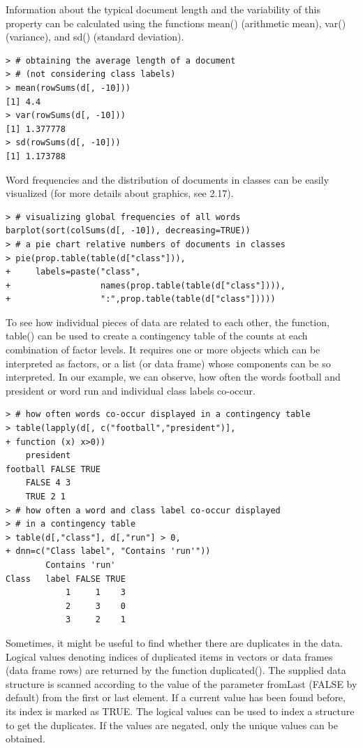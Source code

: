 \documentclass[11pt,openany,executivepaper]{book}
\begin{document}
Information about the typical document length and the variability of this property can be calculated using the functions mean() (arithmetic mean), var() (variance), and sd() (standard deviation).

\begin{verbatim}
> # obtaining the average length of a document
> # (not considering class labels)
> mean(rowSums(d[, -10]))
[1] 4.4
> var(rowSums(d[, -10]))
[1] 1.377778
> sd(rowSums(d[, -10]))
[1] 1.173788
\end{verbatim}

Word frequencies and the distribution of documents in classes can be easily visualized (for more details about graphics, see 2.17).

\begin{verbatim}
> # visualizing global frequencies of all words
barplot(sort(colSums(d[, -10]), decreasing=TRUE))
> # a pie chart relative numbers of documents in classes
> pie(prop.table(table(d["class"])),
+     labels=paste("class",
+                  names(prop.table(table(d["class"]))),
+                  ":",prop.table(table(d["class"]))))
\end{verbatim}

To see how individual pieces of data are related to each other, the function, table() can be used to create a contingency table of the counts at each combination of factor levels. It requires one or more objects which can be interpreted as factors, or a list (or data frame) whose components can be so interpreted. In our example, we can observe, how often the words football and president or word run and individual class labels co-occur.

\begin{verbatim}
> # how often words co-occur displayed in a contingency table
> table(lapply(d[, c("football","president")],
+ function (x) x>0))
    president
football FALSE TRUE
    FALSE 4 3
    TRUE 2 1
> # how often a word and class label co-occur displayed
> # in a contingency table
> table(d[,"class"], d[,"run"] > 0,
+ dnn=c("Class label", "Contains 'run'"))
        Contains 'run'
Class   label FALSE TRUE
            1     1    3
            2     3    0
            3     2    1
\end{verbatim}

Sometimes, it might be useful to find whether there are duplicates in the data. Logical values denoting indices of duplicated items in vectors or data frames (data frame rows) are returned by the function duplicated(). The supplied data structure is scanned according to the value of the parameter fromLast (FALSE by default) from the first or last element. If a current value has been found before, its index is marked as TRUE. The logical values can be used to index a structure to get the duplicates. If the values are negated, only the unique values can be obtained.
\end{document}
